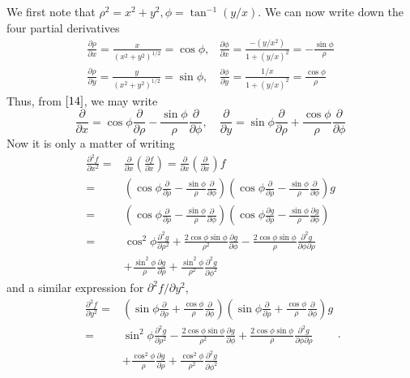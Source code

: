 \documentclass[12pt]{book}
\theoremstyle{definition}\newtheorem{dfn}{Définition}[chapter]
\theoremstyle{plain}\newtheorem{thm}{Théorème}[chapter]
\theoremstyle{plain}\newtheorem{prp}{Proposition}[chapter]
\theoremstyle{plain}\newtheorem{lem}{\bf Lemme}[chapter]
\theoremstyle{plain}\newtheorem{axm}{\bf Axiome}[chapter]
\theoremstyle{plain}\newtheorem{lmm}{\bf Lemme}[chapter]
\theoremstyle{plain}\newtheorem{cor}{\bf Corollaire}[chapter]
\theoremstyle{remark}\newtheorem{rem}{Remarque}[chapter]
\begin{document}
We first note that $\rho^{2}=x^{2}+y^{2}, \phi=\tan ^{-1}(y / x)$. We can now write down the four partial derivatives
$$
\begin{array}{ll}
\frac{\partial \rho}{\partial x}=\frac{x}{\left(x^{2}+y^{2}\right)^{1 / 2}}=\cos \phi, &\frac{\partial \phi}{\partial x}=\frac{-\left(y / x^{2}\right)}{1+(y / x)^{2}}=-\frac{\sin \phi}{\rho} \\
\frac{\partial \rho}{\partial y}=\frac{y}{\left(x^{2}+y^{2}\right)^{1 / 2}}=\sin \phi, & \frac{\partial \phi}{\partial y}=\frac{1 / x}{1+(y / x)^{2}}=\frac{\cos \phi}{\rho}
\end{array}
$$
Thus, from $\ref{14}$, we may write
$$
\frac{\partial}{\partial x}=\cos \phi \frac{\partial}{\partial \rho}-\frac{\sin \phi}{\rho} \frac{\partial}{\partial \phi}, \quad \frac{\partial}{\partial y}=\sin \phi \frac{\partial}{\partial \rho}+\frac{\cos \phi}{\rho} \frac{\partial}{\partial \phi}
$$
Now it is only a matter of writing
$$
\begin{aligned}
\frac{\partial^{2} f}{\partial x^{2}}=& \frac{\partial}{\partial x}\left(\frac{\partial f}{\partial x}\right)=\frac{\partial}{\partial x}\left(\frac{\partial}{\partial x}\right) f \\
=&\left(\cos \phi \frac{\partial}{\partial \rho}-\frac{\sin \phi}{\rho} \frac{\partial}{\partial \phi}\right)\left(\cos \phi \frac{\partial}{\partial \rho}-\frac{\sin \phi}{\rho} \frac{\partial}{\partial \phi}\right) g \\
=&\left(\cos \phi \frac{\partial}{\partial \rho}-\frac{\sin \phi}{\rho} \frac{\partial}{\partial \phi}\right)\left(\cos \phi \frac{\partial g}{\partial \rho}-\frac{\sin \phi}{\rho} \frac{\partial g}{\partial \phi}\right) \\
=& \cos ^{2} \phi \frac{\partial^{2} g}{\partial \rho^{2}}+\frac{2 \cos \phi \sin \phi}{\rho^{2}} \frac{\partial g}{\partial \phi}-\frac{2 \cos \phi \sin \phi}{\rho} \frac{\partial^{2} g}{\partial \phi \partial \rho} \\
&+\frac{\sin ^{2} \phi}{\rho} \frac{\partial g}{\partial \rho}+\frac{\sin ^{2} \phi}{\rho^{2}} \frac{\partial^{2} g}{\partial \phi^{2}}
\end{aligned}
$$
and a similar expression for $\partial^{2} f / \partial y^{2}$,
$$
\begin{aligned}
\frac{\partial^{2} f}{\partial y^{2}}=&\left(\sin \phi \frac{\partial}{\partial \rho}+\frac{\cos \phi}{\rho} \frac{\partial}{\partial \phi}\right)\left(\sin \phi \frac{\partial}{\partial \rho}+\frac{\cos \phi}{\rho} \frac{\partial}{\partial \phi}\right) g \\
=& \sin ^{2} \phi \frac{\partial^{2} g}{\partial \rho^{2}}-\frac{2 \cos \phi \sin \phi}{\rho^{2}} \frac{\partial g}{\partial \phi}+\frac{2 \cos \phi \sin \phi}{\rho} \frac{\partial^{2} g}{\partial \phi \partial \rho} \\
&+\frac{\cos ^{2} \phi}{\rho} \frac{\partial g}{\partial \rho}+\frac{\cos ^{2} \phi}{\rho^{2}} \frac{\partial^{2} g}{\partial \phi^{2}}
\end{aligned}.
$$
\end{document}
